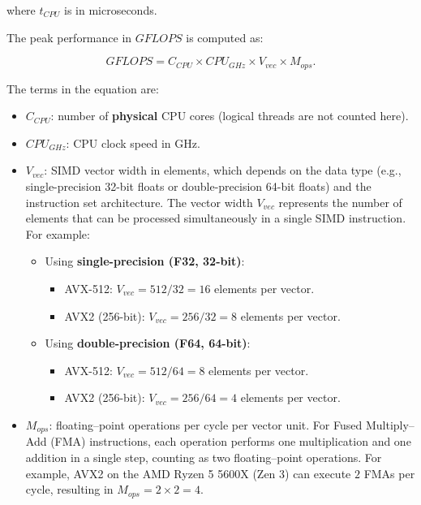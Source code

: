 where $t_{CPU}$ is in microseconds. 

The peak performance in $GFLOPS$ is computed as:

\begin{equation}
GFLOPS = C_{CPU} \times CPU_{GHz} \times V_{vec} \times M_{ops}.
\end{equation}

\noindent The terms in the equation are:
\begin{itemize}
    \item $C_{CPU}$: number of \textbf{physical} CPU cores (logical threads are not counted here).
    \item $CPU_{GHz}$: CPU clock speed in GHz.
    \item $V_{vec}$: SIMD vector width in elements, which depends on the data type (e.g., single-precision 32-bit floats or double-precision 64-bit floats) and the instruction set architecture. The vector width $V_{vec}$ represents the number of elements that can be processed simultaneously in a single SIMD instruction. For example:
        \begin{itemize}
            \item Using \textbf{single-precision (F32, 32-bit)}:
                \begin{itemize}
                    \item AVX-512: $V_{vec} = 512 / 32 = 16$ elements per vector.
                    \item AVX2 (256-bit): $V_{vec} = 256 / 32 = 8$ elements per vector.
                \end{itemize}
            \item Using \textbf{double-precision (F64, 64-bit)}:
                \begin{itemize}
                    \item AVX-512: $V_{vec} = 512 / 64 = 8$ elements per vector.
                    \item AVX2 (256-bit): $V_{vec} = 256 / 64 = 4$ elements per vector.
                \end{itemize}
        \end{itemize}
    \item $M_{ops}$: floating–point operations per cycle per vector unit.
    For Fused Multiply–Add (FMA) \cite{FMA} instructions, each operation performs one multiplication and one addition in a single step, counting as two floating–point operations.
    For example, AVX2 \cite{AVX2} on the AMD Ryzen 5 5600X (Zen 3) can execute $2$ FMAs per cycle, resulting in $M_{ops} = 2 \times 2 = 4$.
\end{itemize}

